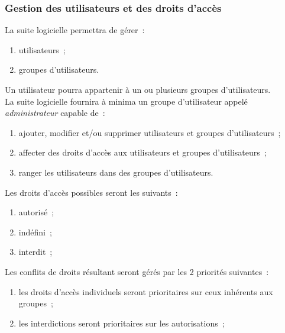 \subsubsection{Gestion des utilisateurs et des droits d'accès}
La suite logicielle permettra de gérer~:
\begin{enumerate}
	\item utilisateurs~;
	\item groupes d'utilisateurs.
\end{enumerate}
Un utilisateur pourra appartenir à un ou plusieurs groupes d'utilisateurs.
\\
La suite logicielle fournira à minima un groupe d'utilisateur appelé \emph{administrateur} capable de~:
\begin{enumerate}
	\item ajouter, modifier et/ou supprimer utilisateurs et groupes d'utilisateurs~;
	\item affecter des droits d'accès aux utilisateurs et groupes d'utilisateurs~;
	\item ranger les utilisateurs dans des groupes d'utilisateurs.
\end{enumerate}
Les droits d'accès possibles seront les suivants~:
\begin{enumerate}
	\item autorisé~;
	\item indéfini~;
	\item interdit~;
\end{enumerate}
Les conflits de droits résultant seront gérés par les 2 priorités suivantes~:
\begin{enumerate}
	\item les droits d'accès individuels seront prioritaires sur ceux inhérents aux groupes~;
	\item les interdictions seront prioritaires sur les autorisations~;
\end{enumerate}

